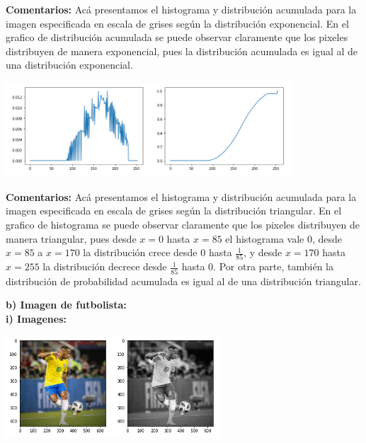 \documentclass[11pt]{article}
\begin{document}
\textbf{Comentarios:} Acá presentamos el histograma y distribución acumulada para la imagen especificada   en escala de grises según la distribución exponencial. En el grafico de distribución acumulada se puede observar claramente que los pixeles distribuyen de manera exponencial, pues la distribución acumulada es igual al de una distribución exponencial. \\

\begin{center}
\includegraphics[width=0.8\textwidth]{./figures/grafico_beto_triangular}
\end{center}

\textbf{Comentarios:} Acá presentamos el histograma y distribución acumulada para la imagen especificada   en escala de grises según la distribución triangular. En el grafico de histograma se puede observar claramente que los pixeles distribuyen de manera triangular, pues desde $ x = 0 $ hasta $ x = 85 $ el histograma vale $ 0 $, desde $ x = 85 $ a $ x = 170 $ la distribución crece desde $ 0 $ hasta $ \frac{1}{85} $, y desde $ x = 170 $ hasta $ x = 255 $ la distribución decrece desde $ \frac{1}{85} $ hasta $ 0 $. Por otra parte, también la distribución de probabilidad acumulada es igual al de una distribución triangular. \\

\newpage

\textbf{b) Imagen de futbolista:} \\

\textbf{i) Imagenes:} \\


\begin{center}
\includegraphics[width=0.6\textwidth]{./figures/neymar_normal}
\end{center}
\end{document}
